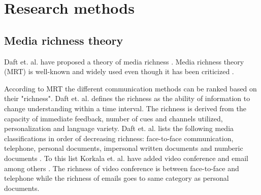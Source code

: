 \documentclass[conference]{IEEEtran}
\begin{document}
\begin{comment}

\subsection{Video conference and telephone}

\subsection{Email}

\subsection{Chat rooms}

\textbf{TODO: Synchronous vs. asynchonous methods, Email, Video conference, documents etc.}

\section{Communication and feedback methods in software projects}

\end{comment}

\section{Research methods}

\subsection{Media richness theory}

Daft et. al. have proposed a theory of media richness \cite{1986daft}. Media richness theory (MRT) is well-known and widely used even though it has been criticized \cite{2006korkala} \cite{1999dennis}. 

According to MRT the different communication methods can be ranked based on their "richness". Daft et. al. defines the richness as the ability of information to change understanding within a time interval. The richness is derived from the capacity of immediate feedback, number of cues and channels utilized, personalization and language variety. Daft et. al. lists the following media classifications in order of decreasing richness: face-to-face communication, telephone, personal documents, impersonal written documents and numberic documents \cite{1986daft}. To this list Korkala et. al. have added video conference and email among others \cite{2006korkala}. The richness of video conference is between face-to-face and telephone while the richness of emails goes to same category as personal documents.
\end{document}
